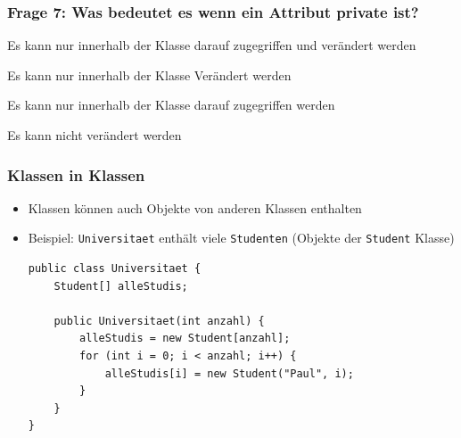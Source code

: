 \documentclass{../../presentation}
\begin{document}
\begin{frame}[fragile]
	\frametitle{Frage 7: Was bedeutet es wenn ein Attribut private ist?}
	\begin{ausgabe}
		\textcolor<2->{green!100!black}{Es kann nur innerhalb der Klasse darauf zugegriffen und verändert werden}
	\end{ausgabe}
	\begin{ausgabe}
		Es kann nur innerhalb der Klasse Verändert werden
	\end{ausgabe}
	\begin{ausgabe}
		Es kann nur innerhalb der Klasse darauf zugegriffen werden
	\end{ausgabe}
	\begin{ausgabe}
		Es kann nicht verändert werden
	\end{ausgabe}
\end{frame}

\begin{frame}[fragile]
	\frametitle{Klassen in Klassen}
	\pause
	\begin{itemize}
		\item Klassen können auch Objekte von anderen Klassen enthalten
		      \pause
		\item Beispiel: \texttt{Universitaet} enthält viele \texttt{Studenten} (Objekte der \texttt{Student} Klasse)
		      \pause
		      \begin{verbatim}
public class Universitaet {
    Student[] alleStudis;

    public Universitaet(int anzahl) {
        alleStudis = new Student[anzahl];
        for (int i = 0; i < anzahl; i++) {
            alleStudis[i] = new Student("Paul", i);
        }
    }
}
\end{verbatim}
	\end{itemize}
\end{frame}
\end{document}
